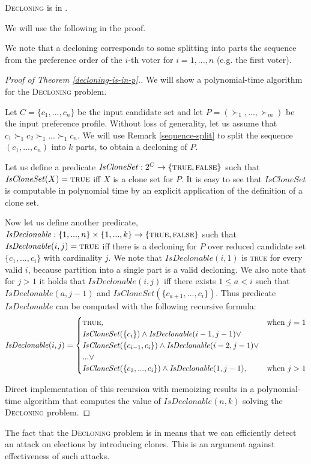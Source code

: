 \begin{thm} \label{decloning-is-in-p}
\textsc{Decloning} is in \p.
\end{thm}

We will use the following in the proof.

\begin{rmrk} \label{sequence-split}
We note that a decloning corresponds to some splitting into parts
the sequence from the preference order of the $i$-th voter for $i=1,...,n$ (e.g. the first voter).
\end{rmrk}

\begin{proof}[Proof of Theorem \ref{decloning-is-in-p}.]
We will show a polynomial-time algorithm for the \textsc{Decloning} problem.

Let $C = \{c_1, ..., c_n\}$ be the input candidate set
and let $P = (\succ_1, ... , \succ_m)$ be the input preference profile.
Without loss of generality, let us assume that $c_1 \succ_1 c_2 \succ_1 ... \succ_1 c_n$.
We will use Remark \ref{sequence-split} to split the sequence $(c_1, ..., c_n)$
into $k$ parts, to obtain a decloning of $P$.

Let us define a predicate
$\mathit{IsCloneSet}: 2^C \rightarrow \{\text{\textsc{true}},\text{\textsc{false}}\}$
such that $\mathit{IsCloneSet}(X) = \text{\textsc{true}}$ iff $X$ is a clone set for $P$.
It is easy to see that $\mathit{IsCloneSet}$ is computable in polynomial time
by an explicit application of the definition of a clone set.

Now let us define another predicate,
$\mathit{IsDeclonable}: \{1,...,n\}\times\{1,...,k\} \rightarrow \{\text{\textsc{true}},\text{\textsc{false}}\}$
such that $\mathit{IsDeclonable}(i,j) = \text{\textsc{true}}$
iff there is a decloning for $P$ over reduced candidate set $\{c_1,...,c_i\}$
with cardinality $j$.
We note that $\mathit{IsDeclonable}(i, 1)$ is \textsc{true} for every valid $i$,
because partition into a single part is a valid decloning.
We also note that for $j>1$ it holds that $\mathit{IsDeclonable}(i,j)$ iff
there exists $1 \leq a < i$ such that $\mathit{IsDeclonable}(a,j-1)$ and $\mathit{IsCloneSet}(\{c_{a+1}, ..., c_i\})$.
Thus predicate $\mathit{IsDeclonable}$ can be computed with the following recursive formula:
$$ \mathit{IsDeclonable}(i,j) =
\begin{cases}
\text{\textsc{true}},	&\text{when $j=1$} \\
\mathit{IsCloneSet}(\{c_i\}) \wedge \mathit{IsDeclonable}(i-1,j-1) \vee \\
\mathit{IsCloneSet}(\{c_{i-1},c_i\}) \wedge \mathit{IsDeclonable}(i-2, j-1) \vee \\
... \vee \\
\mathit{IsCloneSet}(\{c_2,...,c_i\}) \wedge \mathit{IsDeclonable}(1,j-1)
, 		&\text{when $j>1$}
\end{cases}
$$

Direct implementation of this recursion with memoizing
results in a polynomial-time algorithm that computes the value of $IsDeclonable(n,k)$
solving the \textsc{Decloning} problem.
\end{proof}


The fact that the \textsc{Decloning} problem is in \p means that we can efficiently
detect an attack on elections by introducing clones.
This is an argument against effectiveness of such attacks.